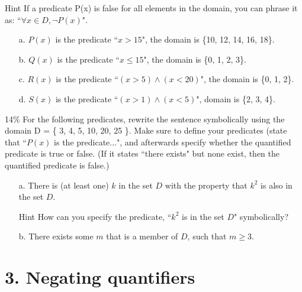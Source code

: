 \documentclass[a4paper,12pt]{book}
\begin{document}
        \begin{hint}{Hint}
            If a predicate P(x) is false for all elements in the domain, you
            can phrase it as: ``$\forall x \in D, \neg P(x)$".
        \end{hint}

        \begin{enumerate}
            \item[a.] $P(x)$ is the predicate ``$x > 15$", the domain is \{10, 12, 14, 16, 18\}.
            \item[b.] $Q(x)$ is the predicate ``$x \leq 15$", the domain is \{0, 1, 2, 3\}.
            \item[c.] $R(x)$ is the predicate ``$(x > 5) \land (x < 20)$", the domain is \{0, 1, 2\}.
            \item[d.] $S(x)$ is the predicate ``$(x > 1) \land (x < 5)$", domain is \{2, 3, 4\}.
        \end{enumerate}

        \newpage
        \begin{question}{4}{14\%}
            For the following predicates, rewrite the sentence symbolically
            using the domain D = \{ 3, 4, 5, 10, 20, 25 \}.
            Make sure to define your predicates (state that ``$P(x)$ is the predicate...",
            and afterwards specify whether the quantified predicate is true or false.
            (If it states ``there exists" but none exist, then the quantified predicate is false.)
        \end{question}

        \begin{enumerate}
            \item[a.] There is (at least one) $k$ in the set $D$ with the property
                that $k^{2}$ is also in the set $D$.
                \begin{hint}{Hint}
                    How can you specify the predicate, ``$k^{2}$ is in the set $D$" symbolically?
                \end{hint}

            \item[b.] There exists some $m$ that is a member of $D$, such that
                $m \geq 3$.
        \end{enumerate}


    \section*{3. Negating quantifiers}
\end{document}

